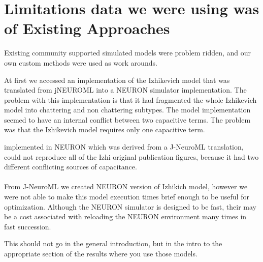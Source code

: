 



\section{Limitations data we were using was of Existing Approaches} 
Existing community supported simulated models were problem ridden, and our own custom methods were used as work arounds.


At first we accessed an implementation of the Izhikevich model that was translated from jNEUROML into a NEURON simulator implementation. The problem with this implementation is that it had fragmented the whole Izhikevich model into chattering and non chattering subtypes. The model implementation seemed to have an internal conflict between two capacitive terms. The problem was that the Izhikevich model requires only one capacitive term.

implemented in NEURON which was derived from a J-NeuroML translation, could not reproduce all of the Izhi original publication figures, because it had two different conflicting sources of capacitance.\\
\\
From J-NeuroML we created NEURON version of Izhikich model, however we were not able to make this model execution times brief enough to be useful for optimization. Although the NEURON simulator is designed to be fast, their may be a cost associated with reloading the NEURON environment many times in fast succession.

This should not go in the general introduction, but in the intro to the appropriate section of the results where you use those models.